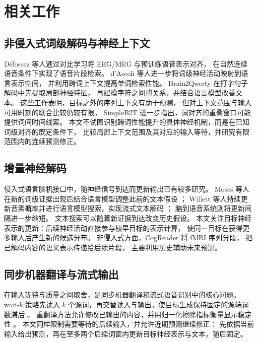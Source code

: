 \section{相关工作}

\subsection{非侵入式词级解码与神经上下文}

Défossez 等人通过对比学习将 EEG/MEG 与预训练语音表示对齐，
在自然连续语音条件下实现了语音片段检索\cite{defossez2023decoding}。
d'Ascoli 等人进一步将词级神经活动映射到语言表示空间，
并利用跨词上下文提高单词检索性能\cite{dascoli2025word}。
Brain2Qwerty 在打字句子解码中先提取局部神经特征，
再建模字符之间的关系，并结合语言模型改善文本\cite{levy2026brain2qwerty}。
这些工作表明，目标之外的序列上下文有助于预测，
但对上下文范围与输入可用时刻的联合比较仍较有限。
SimpleB2T 进一步指出，词对齐的重叠窗口可能提供词间时间线索\cite{jayalath2026timing}。
本文不试图识别跨词性能提升的具体神经机制，而是在已知词级对齐的既定条件下，
比较局部上下文范围及其对应的输入等待，并研究有限范围内的连续预测修正。

\subsection{增量神经解码}

侵入式语言脑机接口中，随神经信号到达而更新输出已有较多研究。
Moses 等人在新的词级证据出现后结合语言模型调整此前的文本假设
\cite{moses2021neuroprosthesis}；
Willett 等人持续更新音素概率并进行语言模型搜索，实现流式文本解码
\cite{willett2023speech}；
脑到语音系统则将更新间隔进一步缩短\cite{littlejohn2025streaming}。
文本搜索可以随着新证据到达改变历史假设。
本文关注目标神经表示的更新：后续神经活动直接参与较早目标的表示计算，
使同一目标在获得更多输入后产生新的候选分布。
非侵入式方面，CogReader 将 fMRI 序列分段，
把已解码内容的语义表示传递给后续片段\cite{lu2025braininspired}，
主要利用历史辅助未来预测。

\subsection{同步机器翻译与流式输出}

在输入等待与质量之间取舍，是同步机器翻译和流式语音识别中的核心问题。
wait-$k$ 策略先读入 $k$ 个源词，再交替读入与输出，使目标生成保持固定的源端词数滞后
\cite{ma2019stacl}。
重翻译方法允许修改已输出的内容，并用归一化擦除指标衡量显示稳定性
\cite{arivazhagan2020retranslation}。
本文同样限制需要等待的后续输入，并允许近期预测继续修正：
先依据当前输入给出预测，再在至多两个后续词窗内更新目标神经表示与文本，随后固定。
